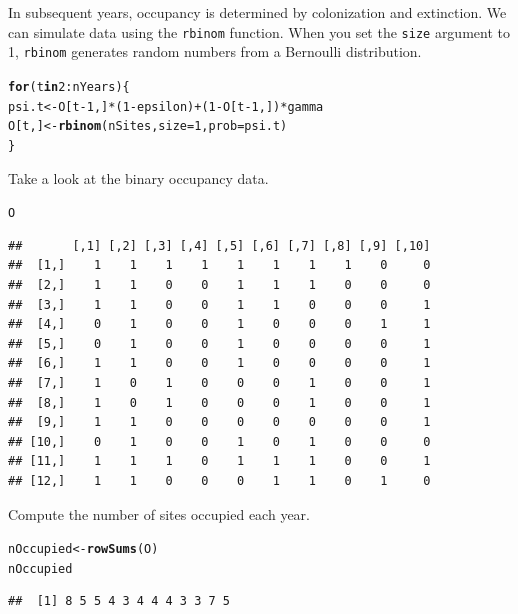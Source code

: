 \documentclass[12pt]{article}\usepackage[]{graphicx}\usepackage[]{xcolor}
\makeatletter
\newcommand{\hlnum}[1]{\textcolor[rgb]{0.686,0.059,0.569}{#1}}%
\newcommand{\hlopt}[1]{\textcolor[rgb]{0,0,0}{#1}}%
\newcommand{\hldef}[1]{\textcolor[rgb]{0.345,0.345,0.345}{#1}}%
\newcommand{\hlkwa}[1]{\textcolor[rgb]{0.161,0.373,0.58}{\textbf{#1}}}%
\newcommand{\hlkwb}[1]{\textcolor[rgb]{0.69,0.353,0.396}{#1}}%
\newcommand{\hlkwc}[1]{\textcolor[rgb]{0.333,0.667,0.333}{#1}}%
\newcommand{\hlkwd}[1]{\textcolor[rgb]{0.737,0.353,0.396}{\textbf{#1}}}%
\newenvironment{kframe}{%
 \def\at@end@of@kframe{}%
 \ifinner\ifhmode%
  \def\at@end@of@kframe{\end{minipage}}%
  \begin{minipage}{\columnwidth}%
 \fi\fi%
 \def\FrameCommand##1{\hskip\@totalleftmargin \hskip-\fboxsep
 \colorbox{shadecolor}{##1}\hskip-\fboxsep
     \hskip-\linewidth \hskip-\@totalleftmargin \hskip\columnwidth}%
 \MakeFramed {\advance\hsize-\width
   \@totalleftmargin\z@ \linewidth\hsize
   \@setminipage}}%
 {\par\unskip\endMakeFramed%
 \at@end@of@kframe}
\newenvironment{knitrout}{}{} %
\makeatother
\begin{document}
In subsequent years, occupancy is determined by colonization and
extinction. We can simulate data using the {\tt rbinom}
function. When you set the {\tt size} argument to 1, {\tt rbinom}
generates random numbers from a Bernoulli distribution.
\begin{knitrout}
\color{fgcolor}\begin{kframe}
\begin{alltt}
\hlkwa{for}\hldef{(t} \hlkwa{in} \hlnum{2}\hlopt{:}\hldef{nYears) \{}
    \hldef{psi.t} \hlkwb{<-} \hldef{O[t}\hlopt{-}\hlnum{1}\hldef{,]}\hlopt{*}\hldef{(}\hlnum{1}\hlopt{-}\hldef{epsilon)} \hlopt{+} \hldef{(}\hlnum{1}\hlopt{-}\hldef{O[t}\hlopt{-}\hlnum{1}\hldef{,])}\hlopt{*}\hldef{gamma}
    \hldef{O[t,]} \hlkwb{<-} \hlkwd{rbinom}\hldef{(nSites,} \hlkwc{size}\hldef{=}\hlnum{1}\hldef{,} \hlkwc{prob}\hldef{=psi.t)}
\hldef{\}}
\end{alltt}
\end{kframe}
\end{knitrout}

Take a look at the binary occupancy data.
\begin{knitrout}
\color{fgcolor}\begin{kframe}
\begin{alltt}
\hldef{O}
\end{alltt}
\begin{verbatim}
##       [,1] [,2] [,3] [,4] [,5] [,6] [,7] [,8] [,9] [,10]
##  [1,]    1    1    1    1    1    1    1    1    0     0
##  [2,]    1    1    0    0    1    1    1    0    0     0
##  [3,]    1    1    0    0    1    1    0    0    0     1
##  [4,]    0    1    0    0    1    0    0    0    1     1
##  [5,]    0    1    0    0    1    0    0    0    0     1
##  [6,]    1    1    0    0    1    0    0    0    0     1
##  [7,]    1    0    1    0    0    0    1    0    0     1
##  [8,]    1    0    1    0    0    0    1    0    0     1
##  [9,]    1    1    0    0    0    0    0    0    0     1
## [10,]    0    1    0    0    1    0    1    0    0     0
## [11,]    1    1    1    0    1    1    1    0    0     1
## [12,]    1    1    0    0    0    1    1    0    1     0
\end{verbatim}
\end{kframe}
\end{knitrout}

Compute the number of sites occupied each year.
\begin{knitrout}
\color{fgcolor}\begin{kframe}
\begin{alltt}
\hldef{nOccupied} \hlkwb{<-} \hlkwd{rowSums}\hldef{(O)}
\hldef{nOccupied}
\end{alltt}
\begin{verbatim}
##  [1] 8 5 5 4 3 4 4 4 3 3 7 5
\end{verbatim}
\end{kframe}
\end{knitrout}
\end{document}
